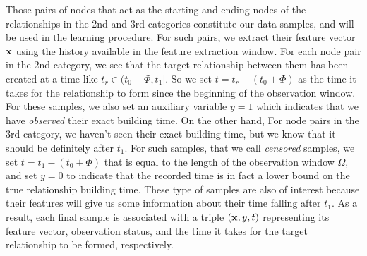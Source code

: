 Those pairs of nodes that act as the starting and ending nodes of the relationships in the 2nd and 3rd categories constitute our data samples, and will be used in the learning procedure. For such pairs, we extract their feature vector $\mathbf{x}$ using the history available in the feature extraction window. For each node pair in the 2nd category, we see that the target relationship between them has been created at a time like $t_r\in(t_0+\Phi,t_1]$. So we set $t=t_r-(t_0+\Phi)$ as the time it takes for the relationship to form since the beginning of the observation window. For these samples, we also set an auxiliary variable $y=1$ which indicates that we have \emph{observed} their exact building time. On the other hand, For node pairs in the 3rd category, we haven't seen their exact building time, but we know that it should be definitely after $t_1$. For such samples, that we call \emph{censored} samples, we set $t=t_1-(t_0+\Phi)$ that is equal to the length of the observation window $\Omega$, and set $y=0$ to indicate that the recorded time is in fact a lower bound on the true relationship building time. These type of samples are also of interest because their features will give us some information about their time falling after $t_1$. As a result, each final sample is associated with a triple $(\mathbf{x},y,t)$ representing its feature vector, observation status, and the time it takes for the target relationship to be formed, respectively.



